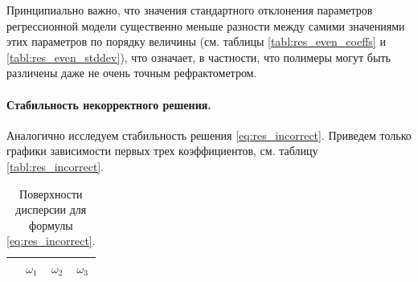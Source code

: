 \documentclass[11pt,a4paper]{article}
\theoremstyle{definition}
\begin{document}
Принципиально важно, что значения стандартного отклонения параметров регрессионной
модели существенно меньше разности между самими значениями этих параметров по порядку величины
(см. таблицы \ref{tabl:res_even_coeffs} и \ref{tabl:res_even_stddev}), что означает, в частности,
что полимеры могут быть различены даже не очень точным рефрактометром.

\paragraph{Стабильность некорректного решения.}

Аналогично исследуем стабильность решения \eqref{eq:res_incorrect}. Приведем только графики
зависимости первых трех коэффициентов, см. таблицу \ref{tabl:res_incorrect}.

\begin{table}[h]
  \centering
  \footnotesize
  \caption{Поверхности дисперсии для формулы \eqref{eq:res_incorrect}.}
  \begin{tabular}{l | c c c}
	  & $\omega_1$ & $\omega_2$ & $\omega_3$ \\ \hline

\end{tabular}
\end{table}
\end{document}
